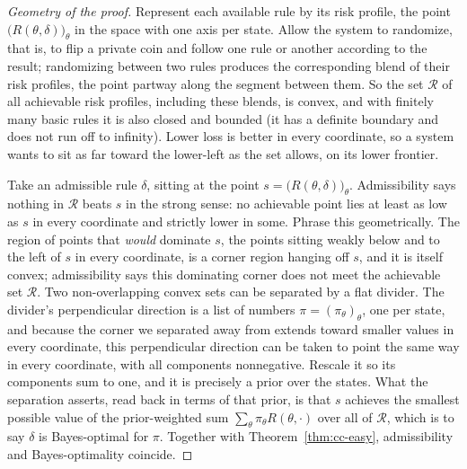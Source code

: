\documentclass[10pt]{article}
\theoremstyle{definition}
\theoremstyle{remark}
\begin{document}
\begin{proof}[Geometry of the proof]
Represent each available rule by its risk profile, the point $\big(R(\theta, \delta)\big)_{\theta}$ in the space with one axis per state. Allow the system to randomize, that is, to flip a private coin and follow one rule or another according to the result; randomizing between two rules produces the corresponding blend of their risk profiles, the point partway along the segment between them. So the set $\mathcal{R}$ of all achievable risk profiles, including these blends, is convex, and with finitely many basic rules it is also closed and bounded (it has a definite boundary and does not run off to infinity). Lower loss is better in every coordinate, so a system wants to sit as far toward the lower-left as the set allows, on its lower frontier.

Take an admissible rule $\delta$, sitting at the point $s = \big(R(\theta, \delta)\big)_\theta$. Admissibility says nothing in $\mathcal{R}$ beats $s$ in the strong sense: no achievable point lies at least as low as $s$ in every coordinate and strictly lower in some. Phrase this geometrically. The region of points that \emph{would} dominate $s$, the points sitting weakly below and to the left of $s$ in every coordinate, is a corner region hanging off $s$, and it is itself convex; admissibility says this dominating corner does not meet the achievable set $\mathcal{R}$. Two non-overlapping convex sets can be separated by a flat divider. The divider's perpendicular direction is a list of numbers $\pi = (\pi_\theta)_\theta$, one per state, and because the corner we separated away from extends toward smaller values in every coordinate, this perpendicular direction can be taken to point the same way in every coordinate, with all components nonnegative. Rescale it so its components sum to one, and it is precisely a prior over the states. What the separation asserts, read back in terms of that prior, is that $s$ achieves the smallest possible value of the prior-weighted sum $\sum_\theta \pi_\theta R(\theta, \cdot)$ over all of $\mathcal{R}$, which is to say $\delta$ is Bayes-optimal for $\pi$. Together with Theorem~\ref{thm:cc-easy}, admissibility and Bayes-optimality coincide.
\end{proof}
\end{document}
